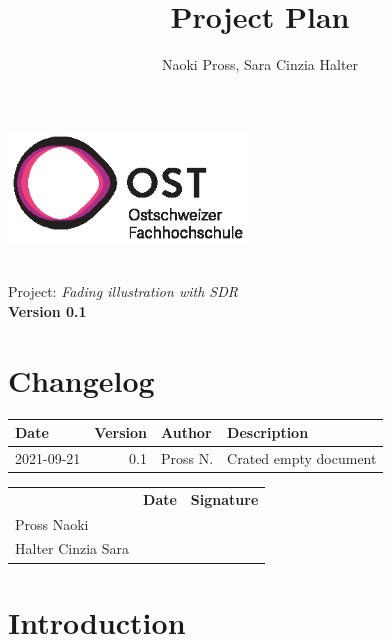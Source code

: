 \documentclass[a4paper, twosided, 11pt]{scrartcl}
\title{Project Plan}
\author{Naoki Pross, Sara Cinzia Halter}
\begin{document}
\begin{titlepage}
  \includegraphics[height=3cm]{fig/ost-logo}
  \begin{flushright}
    \vspace{5cm}
    {\Huge \bfseries \thetitle} \\
    \vspace{5mm}
    {\LARGE Project: \textit{Fading illustration with SDR}} \\
    \vspace{5mm}
    {\LARGE \bfseries Version 0.1}
  \end{flushright}
\end{titlepage}

\section*{Changelog}
\begin{tabularx}{\textwidth}{lrlX}
  \toprule
  \bfseries Date & \bfseries Version & \bfseries Author & \bfseries Description \\
  \midrule
  2021-09-21 & 0.1 & Pross N.  & Crated empty document \\
  \bottomrule
\end{tabularx}

\vfill
{
  \renewcommand{\arraystretch}{2}
  \begin{tabularx}{\textwidth}{lp{}X}
                       & \bfseries Date & \bfseries Signature\\
    Pross Naoki        & \hrulefill & \hrulefill \\
    Halter Cinzia Sara & \hrulefill & \hrulefill \\
  \end{tabularx}
}

\clearpage
\tableofcontents
\listoffigures
\listoftables
\clearpage

\section{Introduction}

\clearpage
\end{document}
